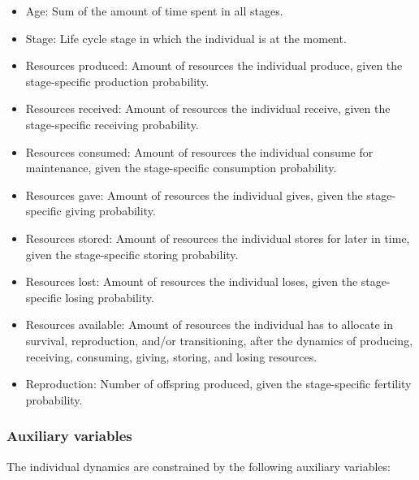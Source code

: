 \documentclass{article}
\begin{document}
\begin{itemize}
    \item Age: Sum of the amount of time spent in all stages.
    \item Stage: Life cycle stage in which the individual is at the moment.
    \item Resources produced: Amount of resources the individual produce, given the stage-specific production probability.
    \item Resources received: Amount of resources the individual receive, given the stage-specific receiving probability.
    \item Resources consumed: Amount of resources the individual consume for maintenance, given the stage-specific consumption probability.
    \item Resources gave: Amount of resources the individual gives, given the stage-specific giving probability.
    \item Resources stored: Amount of resources the individual stores for later in time, given the stage-specific storing probability.
    \item Resources lost: Amount of resources the individual loses, given the stage-specific losing probability.
    \item Resources available: Amount of resources the individual has to allocate in survival, reproduction, and/or transitioning, after the dynamics of producing, receiving, consuming, giving, storing, and losing resources.
    \item Reproduction: Number of offspring produced, given the stage-specific fertility probability.
\end{itemize}

\subsubsection{Auxiliary variables}

The individual dynamics are constrained by the following auxiliary variables:
\end{document}
